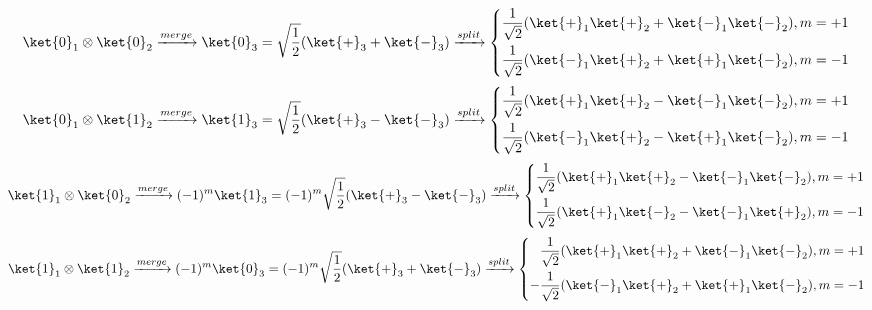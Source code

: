 \documentclass[11pt]{article}
\begin{document}
\begin{equation}
\ket{0}_1 \otimes \ket{0}_2 \xrightarrow{merge} \ket{0}_3 = \sqrt{\frac{1}{2}}(\ket{+}_3 + \ket{-}_3) \xrightarrow{split} \left\{  
             \begin{aligned}
             \frac{1}{\sqrt{2}}(\ket{+}_1\ket{+}_2 + \ket{-}_1\ket{-}_2) , m = +1\\   
              \frac{1}{\sqrt{2}}(\ket{-}_1\ket{+}_2 + \ket{+}_1\ket{-}_2) , m = -1  
             \end{aligned}  
\right. 
\end{equation}
\begin{equation}
\ket{0}_1 \otimes \ket{1}_2 \xrightarrow{merge} \ket{1}_3 = \sqrt{\frac{1}{2}}(\ket{+}_3 - \ket{-}_3) \xrightarrow{split} \left\{  
             \begin{aligned}
             \frac{1}{\sqrt{2}}(\ket{+}_1\ket{+}_2 - \ket{-}_1\ket{-}_2) , m = +1\\   
              \frac{1}{\sqrt{2}}(\ket{-}_1\ket{+}_2 - \ket{+}_1\ket{-}_2) , m = -1  
             \end{aligned} 
\right. 
\end{equation}
\begin{equation}
\ket{1}_1 \otimes \ket{0}_2 \xrightarrow{merge} (-1)^m\ket{1}_3 = (-1)^m\sqrt{\frac{1}{2}}(\ket{+}_3 - \ket{-}_3) \xrightarrow{split} \left\{  
             \begin{aligned}  
             \frac{1}{\sqrt{2}}(\ket{+}_1\ket{+}_2 - \ket{-}_1\ket{-}_2) , m = +1\\   
              \frac{1}{\sqrt{2}}(\ket{+}_1\ket{-}_2 - \ket{-}_1\ket{+}_2) , m = -1  
             \end{aligned}  
\right. 
\end{equation}
\begin{equation}
\ket{1}_1 \otimes \ket{1}_2 \xrightarrow{merge} (-1)^m\ket{0}_3 = (-1)^m\sqrt{\frac{1}{2}}(\ket{+}_3 + \ket{-}_3) \xrightarrow{split} \left\{  
             \begin{aligned} 
             \frac{1}{\sqrt{2}}(\ket{+}_1\ket{+}_2 + \ket{-}_1\ket{-}_2) , m = +1\\   
              -\frac{1}{\sqrt{2}}(\ket{-}_1\ket{+}_2 + \ket{+}_1\ket{-}_2) , m = -1  
             \end{aligned} 
\right.  
\end{equation}
\end{document}
